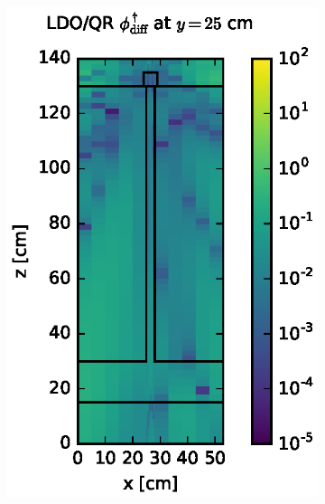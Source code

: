 \begin{figure}[!htb]
\centering
\begin{subfigure}{0.4\textwidth}
\includegraphics[max height=0.445\textheight]
{img/steel-plots/cad-adj/flux-diff-rel-qr04.eps}
\end{subfigure} ~
\begin{subfigure}{0.4\textwidth}

\end{subfigure}
\end{figure}
